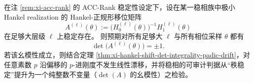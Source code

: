 \begin{conjecture}\label{conj:xi-acc-rank-unimodular-shift-matrix}
在注 \ref{rem:xi-acc-rank} 的 ACC-Rank 稳定性设定下，设在某一稳相族中极小 Hankel realization 的 Hankel-正规形移位矩阵
\[
A^{(\ell)}(\theta):=\bigl(H_0^{(\ell)}(\theta)\bigr)^{-1}H_1^{(\ell)}(\theta)
\]
在足够大层级 \(\ell\) 上稳定存在。
则预期对所有足够大 \(\ell\) 与所有相位采样 \(\theta\) 都有
\[
\det\!\bigl(A^{(\ell)}(\theta)\bigr)=\pm 1.
\]
若该幺模性成立，则结合定理 \ref{thm:xi-hankel-shift-det-integrality-padic-drift}，对任意素数 \(p\) 沿偏移的 \(p\)-进刚度不发生线性漂移，并将稳相的可审计判据从“秩稳定”提升为一个纯整数不变量（\(\det(A)\) 的幺模性）之检验。
\end{conjecture}

